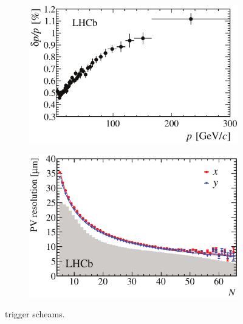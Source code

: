\begin{figure}[t]
  \centering
  \begin{subfigure}{0.5\textwidth}
    \raggedright
    \includegraphics[width=\textwidth]{Figures/Chapter2/dppVsp-crop-cmyk}
    \caption{}
    \label{det_dpvp}
  \end{subfigure}%
  \begin{subfigure}{0.5\textwidth}
    \raggedleft
    \includegraphics[width=\textwidth]{Figures/Chapter2/DataResXY_1PV_2012-crop-cmyk.pdf}
    \caption{}
    \label{det_velo_pv_res}
  \end{subfigure}
  \caption{ trigger scheams.}
  \label{det_velo_perf}
\end{figure}

